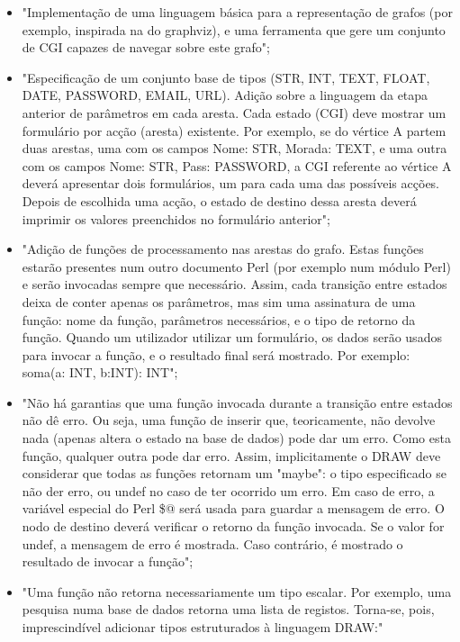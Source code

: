 \documentclass[a4paper]{article}
\begin{document}
\begin{itemize}
\item "Implementação de uma linguagem básica para a representação de grafos (por exemplo, inspirada na do graphviz), e uma ferramenta que gere um conjunto de CGI capazes de navegar sobre este grafo";
\item "Especificação de um conjunto base de tipos (STR, INT, TEXT, FLOAT, DATE, PASSWORD, EMAIL, URL). Adição sobre a linguagem da etapa anterior de parâmetros em cada aresta. Cada estado (CGI) deve mostrar um formulário por acção (aresta) existente. Por exemplo, se do vértice A partem duas arestas, uma com os campos Nome: STR, Morada: TEXT, e uma outra com os campos Nome: STR, Pass: PASSWORD, a CGI referente ao vértice A deverá apresentar dois formulários, um para cada uma das possíveis acções. Depois de escolhida uma acção, o estado de destino dessa aresta deverá imprimir os valores preenchidos no formulário anterior";
\item "Adição de funções de processamento nas arestas do grafo. Estas funções estarão presentes num outro documento Perl (por exemplo num módulo Perl) e serão invocadas sempre que necessário. Assim, cada transição entre estados deixa de conter apenas os parâmetros, mas sim uma assinatura de uma função: nome da função, parâmetros necessários, e o tipo de retorno da função. Quando um utilizador utilizar um formulário, os dados serão usados para invocar a função, e o resultado final será mostrado. Por exemplo: soma(a: INT, b:INT): INT";
\item "Não há garantias que uma função invocada durante a transição entre estados não dê erro. Ou seja, uma função de inserir que, teoricamente, não devolve nada (apenas altera o estado na base de dados) pode dar um erro. Como esta função, qualquer outra pode dar erro. Assim, implicitamente o DRAW deve considerar que todas as funções retornam um "maybe": o tipo especificado se não der erro, ou undef no caso de ter ocorrido um erro. Em caso de erro, a variável especial do Perl \$@ será usada para guardar a mensagem de erro. O nodo de destino deverá verificar o retorno da função invocada. Se o valor for undef, a mensagem de erro é mostrada. Caso contrário, é mostrado o resultado de invocar a função";
\item "Uma função não retorna necessariamente um tipo escalar. Por exemplo, uma pesquisa numa base de dados retorna uma lista de registos. Torna-se, pois, imprescindível adicionar tipos estruturados à linguagem DRAW:"
\begin{itemize}

\end{itemize}
\end{itemize}
\end{document}
